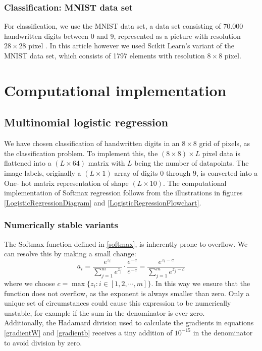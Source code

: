 \documentclass[11pt,a4paper,titlepage]{article}
\begin{document}
\subsubsection{Classification: MNIST data set}
For classification, we use the MNIST data set, a data set consisting of 70.000 handwritten digits between 0 and 9, represented as a picture with resolution $28\times28$ pixel \citep{lecun2010mnist}. In this article however we used Scikit Learn's variant of the MNIST data set, which consists of 1797 elements with resolution $8\times8$ pixel. 
\section{Computational implementation}

\subsection{Multinomial logistic regression}
We have chosen classification of handwritten digits in an $8\times 8$ grid of pixels, as the classification problem. To implement this, the $(8\times 8)\times L$ pixel data is flattened into a $(L \times 64)$ matrix with $L$ being the number of datapoints. The image labels, originally a $(L \times 1)$ array of digits $0$ through $9$, is converted into a One- hot matrix representation of shape $(L \times 10)$. The computational implementation of Softmax regression follows from the illustrations in figures \ref{LogisticRegressionDiagram} and \ref{LogisticRegressionFlowchart}. 

\subsubsection{Numerically stable variants}
The Softmax function defined in \eqref{softmax}, is inherently prone to overflow. We can resolve this by making a small change:
\begin{equation}
a_i= \frac{e^{z_i}}{\sum_{j=1}^{m} e^{z_j}} \cdot \frac{e^{-c}}{e^{-c}} = \frac{e^{z_i-c}}{\sum_{j=1}^{m} e^{z_j-c}}
\end{equation}
where we choose $c = \max \{ z_i : i \in [1,2,\cdots ,m]\} $. In this way we ensure that the function does not overflow, as the exponent is always smaller than zero. Only a unique set of circumstances could cause this expression to be numerically unstable, for example if the sum in the denominator is ever zero.\\Additionally, the Hadamard division used to calculate the gradients in equations \eqref{gradientW} and \eqref{gradientb} receives a tiny addition of $10^{-15}$ in the denominator to avoid division by zero.
\end{document}

